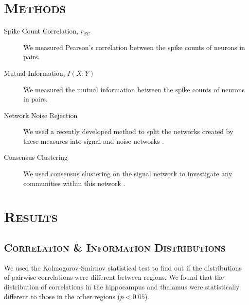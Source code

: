 \documentclass[a0,portrait]{a0poster}
\begin{document}
\begin{multicols}{2}


\section*{\color{NavyBlue}\textsc{Methods}\color{Black}}

\begin{description}
  \item[Spike Count Correlation, $r_{SC}$] We measured Pearson's correlation between the spike counts of neurons in pairs.
  \item[Mutual Information, $I(X;Y)$] We measured the mutual information between the spike counts of neurons in pairs.
  \item[Network Noise Rejection] We used a recently developed method to split the networks created by these measures into signal and noise networks \cite{humphries}.
  \item[Consensus Clustering] We used consensus clustering on the signal network to investigate any communities within this  network \cite{humphries}.
\end{description}


\section*{\color{NavyBlue}\textsc{Results}\color{Black}}

\subsection*{\color{NavyBlue}\textsc{Correlation \& Information Distributions}\color{Black}}

We used the Kolmogorov-Smirnov statistical test to find out if the distributions of pairwise correlations were different between regions. We found that the distribution of correlations in the hippocampus and thalamus were statistically different to those in the other regions ($p < 0.05$).


\end{multicols}
\end{document}

